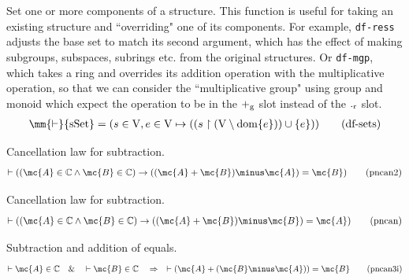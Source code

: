 \begin{metadefinition} Set one or more components of a
structure.  This function is useful for
       taking an existing structure and ``overriding" one of its components.
       For example, {\tt df-ress} adjusts the base set to match its second
       argument, which has the effect of making subgroups, subspaces, subrings
       etc. from the original structures.  Or {\tt df-mgp}, which takes a ring
and
       overrides its addition operation with the multiplicative operation, so
       that we can consider the ``multiplicative group" using group and monoid
       which expect the operation to be in the $+_{\rm g}$ slot
instead of
       the $._{\rm r}$ slot.  %
\begin{align}
\mm{\vdash} {\rm sSet} = ( s \in {\rm V} , e \in {\rm V} \mapsto ( ( s
    \restriction ( {\rm V} \setminus {\rm dom} \{ e \} ) ) \cup \{ e \} )
    )\label{eq:df-sets}\tag{df-sets}
\end{align}
\end{metadefinition}


\begin{lemma} Cancellation law for subtraction. 
\begin{align}
\vdash ( ( \mc{A} \in \mathbb{C} \wedge \mc{B} \in \mathbb{C} ) \rightarrow ( (
    \mc{A} + \mc{B} ) \minus \mc{A} ) = \mc{B} )\label{eq:pncan2}\tag{pncan2}
\end{align}
\end{lemma}


\begin{lemma} Cancellation law for subtraction. 
\begin{align}
\vdash ( ( \mc{A} \in \mathbb{C} \wedge \mc{B} \in \mathbb{C} ) \rightarrow ( (
    \mc{A} + \mc{B} ) \minus \mc{B} ) = \mc{A} )\label{eq:pncan}\tag{pncan}
\end{align}
\end{lemma}


\begin{lemma} Subtraction and addition of equals. 
\begin{align}
\vdash \mc{A} \in \mathbb{C}\quad\&\quad \vdash \mc{B} \in
    \mathbb{C}\quad\Rightarrow\quad \vdash ( \mc{A} + ( \mc{B} \minus \mc{A} ) ) =
    \mc{B}\label{eq:pncan3i}\tag{pncan3i}
\end{align}
\end{lemma}


